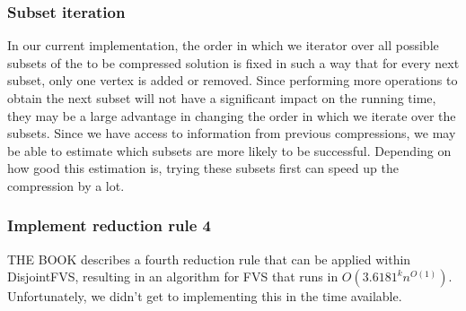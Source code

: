 \subsubsection{Subset iteration}
In our current implementation, the order in which we iterator over all possible subsets
of the to be compressed solution is fixed in such a way that for every next subset, only one vertex is added or removed.
Since performing more operations to obtain the next subset will not have a significant impact on the running time, they
may be a large advantage in changing the order in which we iterate over the subsets. Since we have access to information
from previous compressions, we may be able to estimate which subsets are more likely to be successful. Depending on how
good this estimation is, trying these subsets first can speed up the compression by a lot.

\subsubsection{Implement reduction rule 4}
THE BOOK describes a fourth reduction rule that can be applied within {\sc
DisjointFVS}, resulting in an algorithm for FVS that runs in $O(3.6181^kn^{O(1)})$.  Unfortunately, we didn't get to implementing
this in the time available.
